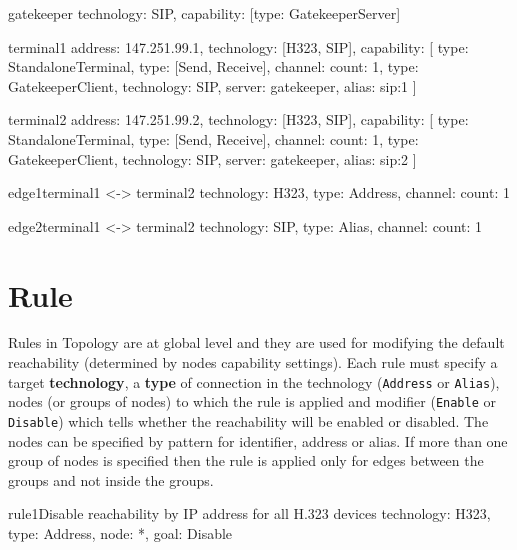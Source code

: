\documentclass[a4paper]{report}
\begin{document}
\begin{TopologyExample}{gatekeeper}{}
technology: SIP,
capability: [{type: GatekeeperServer}]
\end{TopologyExample}

\begin{TopologyExample}{terminal1}{}
address: 147.251.99.1,
technology: [H323, SIP],
capability: [
  {type: StandaloneTerminal},
  {type: [Send, Receive], channel: {count: 1}}, 
  {type: GatekeeperClient, technology: SIP, server: gatekeeper, alias: sip:1}
]
\end{TopologyExample}

\begin{TopologyExample}{terminal2}{}
address: 147.251.99.2,
technology: [H323, SIP],
capability: [
  {type: StandaloneTerminal},
  {type: [Send, Receive], channel: {count: 1}}, 
  {type: GatekeeperClient, technology: SIP, server: gatekeeper, alias: sip:2}
]
\end{TopologyExample}

\begin{TopologyExample}{edge1}{terminal1 <-> terminal2}
technology: H323,
type: Address,
channel: {count: 1}
\end{TopologyExample}

\begin{TopologyExample}{edge2}{terminal1 <-> terminal2}
technology: SIP,
type: Alias,
channel: {count: 1}
\end{TopologyExample} 
  
  
\section{Rule}
Rules in Topology are at global level and they are used for modifying the default reachability (determined by nodes capability settings). Each rule must specify a target \textbf{technology}, a \textbf{type} of connection in the technology (\verb|Address| or \verb|Alias|), nodes (or groups of nodes) to which the rule is applied and modifier (\verb|Enable| or \verb|Disable|) which tells whether the reachability will be enabled or disabled. The nodes can be specified by pattern for identifier, address or alias. If more than one group of nodes is specified then the rule is applied only for edges between the groups and not inside the groups.

\begin{TopologyExample}{rule1}{Disable reachability by IP address for all H.323 devices}
technology: H323,
type: Address,
node: *,
goal: Disable
\end{TopologyExample}
\end{document}
